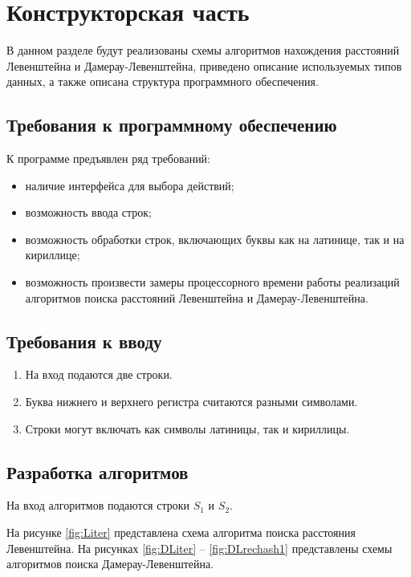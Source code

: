 \chapter{Конструкторская часть}

В данном разделе будут реализованы схемы алгоритмов нахождения расстояний Левенштейна и Дамерау-Левенштейна, приведено описание используемых типов данных, а также описана структура программного обеспечения.

\section{Требования к программному обеспечению}\label{section:requirements}
К программе предъявлен ряд требований:
\begin{itemize}[label=---]
	\item наличие интерфейса для выбора действий;
	\item возможность ввода строк;
	\item возможность обработки строк, включающих буквы как на латинице, так и на кириллице;
	\item возможность произвести замеры процессорного времени работы реализаций алгоритмов поиска расстояний Левенштейна и Дамерау-Левенштейна.
\end{itemize}

\section{Требования к вводу}\label{section:requirements}
\begin{enumerate}
    \item На вход подаются две строки.
    \item Буква нижнего и верхнего регистра считаются разными символами.
    \item Строки могут включать как символы латиницы, так и кириллицы.
\end{enumerate}

\section{Разработка алгоритмов}

На вход алгоритмов подаются строки $S_1$ и $S_2$.

На рисунке \ref{fig:Liter} представлена схема алгоритма поиска расстояния Левенштейна.
На рисунках \ref{fig:DLiter} -- \ref{fig:DLrechash1} представлены схемы алгоритмов поиска Дамерау-Левенштейна.

